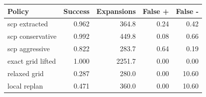 \begin{tabular}{lrrrr}
\toprule
Policy & Success & Expansions & False + & False - \\
\midrule
scp extracted & 0.962 & 364.8 & 0.24 & 0.42 \\
scp conservative & 0.992 & 449.8 & 0.08 & 0.66 \\
scp aggressive & 0.822 & 283.7 & 0.64 & 0.19 \\
exact grid lifted & 1.000 & 2251.7 & 0.00 & 0.00 \\
relaxed grid & 0.287 & 280.0 & 0.00 & 10.60 \\
local replan & 0.471 & 360.0 & 0.00 & 10.60 \\
\bottomrule
\end{tabular}
